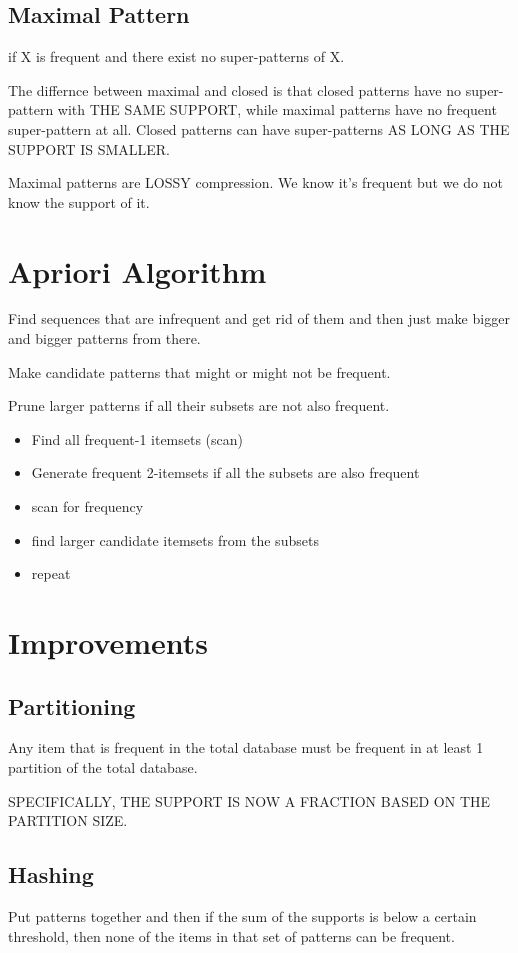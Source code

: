 \documentclass[fleqn]{report}
\begin{document}
\subsection{Maximal Pattern}
if X is frequent and there exist no super-patterns of X. 

The differnce between maximal and closed is that 
closed patterns have no super-pattern with THE SAME SUPPORT, 
while maximal patterns have no frequent super-pattern at all.
Closed patterns can have super-patterns AS LONG AS THE SUPPORT 
IS SMALLER.

Maximal patterns are LOSSY compression. We know it's frequent but we do 
not know the support of it. 

\section{Apriori Algorithm}
Find sequences that are infrequent and get rid of them and then just 
make bigger and bigger patterns from there. 

Make candidate patterns that might or might not be frequent.

Prune larger patterns if all their subsets are not also frequent.

\begin{itemize}
    \item 
    Find all frequent-1 itemsets (scan)
    \item 
    Generate frequent 2-itemsets if 
    all the subsets are also frequent 
    \item 
    scan for frequency 
    \item 
    find larger candidate itemsets from the subsets 
    \item 
    repeat 
\end{itemize}

\section{Improvements}

\subsection{Partitioning}
Any item that is frequent in the total database must be frequent in 
at least 1 partition of the total database. 

SPECIFICALLY, THE SUPPORT IS NOW A FRACTION BASED 
ON THE PARTITION SIZE.

\subsection{Hashing}
Put patterns together and then if the sum of the supports 
is below a certain threshold, then none of the items in that 
set of patterns can be frequent.
\end{document}
